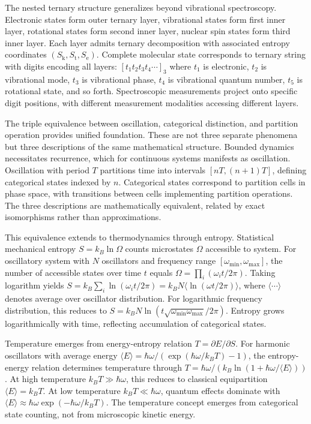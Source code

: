\documentclass[twocolumn,10pt]{article}
\newcommand{\Sk}{S_{\text{k}}}
\newcommand{\St}{S_{\text{t}}}
\newcommand{\Se}{S_{\text{e}}}
\begin{document}
The nested ternary structure generalizes beyond vibrational spectroscopy. Electronic states form outer ternary layer, vibrational states form first inner layer, rotational states form second inner layer, nuclear spin states form third inner layer. Each layer admits ternary decomposition with associated entropy coordinates $(\Sk, \St, \Se)$. Complete molecular state corresponds to ternary string with digits encoding all layers: $[t_1 t_2 t_3 t_4 \cdots]_3$ where $t_1$ is electronic, $t_2$ is vibrational mode, $t_3$ is vibrational phase, $t_4$ is vibrational quantum number, $t_5$ is rotational state, and so forth. Spectroscopic measurements project onto specific digit positions, with different measurement modalities accessing different layers.

The triple equivalence between oscillation, categorical distinction, and partition operation provides unified foundation. These are not three separate phenomena but three descriptions of the same mathematical structure. Bounded dynamics necessitates recurrence, which for continuous systems manifests as oscillation. Oscillation with period $T$ partitions time into intervals $[nT, (n+1)T]$, defining categorical states indexed by $n$. Categorical states correspond to partition cells in phase space, with transitions between cells implementing partition operations. The three descriptions are mathematically equivalent, related by exact isomorphisms rather than approximations.

This equivalence extends to thermodynamics through entropy. Statistical mechanical entropy $S = k_B \ln \Omega$ counts microstates $\Omega$ accessible to system. For oscillatory system with $N$ oscillators and frequency range $[\omega_{\min}, \omega_{\max}]$, the number of accessible states over time $t$ equals $\Omega = \prod_i (\omega_i t / 2\pi)$. Taking logarithm yields $S = k_B \sum_i \ln(\omega_i t / 2\pi) = k_B N \langle \ln(\omega t / 2\pi) \rangle$, where $\langle \cdots \rangle$ denotes average over oscillator distribution. For logarithmic frequency distribution, this reduces to $S = k_B N \ln(t \sqrt{\omega_{\min} \omega_{\max}} / 2\pi)$. Entropy grows logarithmically with time, reflecting accumulation of categorical states.

Temperature emerges from energy-entropy relation $T = \partial E / \partial S$. For harmonic oscillators with average energy $\langle E \rangle = \hbar \omega / (\exp(\hbar \omega / k_B T) - 1)$, the entropy-energy relation determines temperature through $T = \hbar \omega / (k_B \ln(1 + \hbar \omega / \langle E \rangle))$. At high temperature $k_B T \gg \hbar \omega$, this reduces to classical equipartition $\langle E \rangle = k_B T$. At low temperature $k_B T \ll \hbar \omega$, quantum effects dominate with $\langle E \rangle \approx \hbar \omega \exp(-\hbar \omega / k_B T)$. The temperature concept emerges from categorical state counting, not from microscopic kinetic energy.
\end{document}
